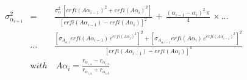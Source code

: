 


\begin{eqnarray*}
  \sigma_{\alpha_{i+1}}^2 & = & \frac{\sigma_\alpha^2\,
      \left[ {erfi \left( A \alpha_{i-1} \right)}^2 + 
             {erfi \left( A \alpha_{i} \right)}^2 \right] }
      {{\left[ erfi \left( A \alpha_{i-1} \right) - 
               erfi \left( A \alpha_{i} \right) \right]}^2}\, + \,
      \frac{{\left( \alpha_{i-1} - \alpha_{i} \right) }^2\,\pi}{4}\,\times\ldots\\
      &\ldots& \frac{ {\left[ \sigma_{A_{\alpha,i}} 
                     erfi \left( A \alpha_{i-1} \right)\,
                     e^{{erfi \left( A \alpha_{i} \right)}^2} \right]}^2
             +
             {\left[ \sigma_{A_{\alpha,i-1}} 
                     erfi \left( A \alpha_{i} \right)\,
                     e^{{erfi \left( A \alpha_{i-1} \right)}^2} \right]}^2 }
             {{\left[ erfi \left( A \alpha_{i-1} \right) - 
         erfi \left( A \alpha_{i} \right) \right] }^4} \\
  &{\mathrm with}& \ A \alpha_{i} = \frac{r_{\alpha_{i,a}} - r_{\alpha_{i,b}}}
	                                      {r_{\alpha_{i,a}} + r_{\alpha_{i,b}}}
\end{eqnarray*}

